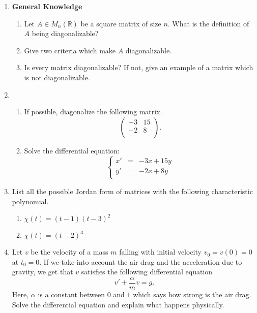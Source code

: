 \documentclass{article}
\begin{document}
\begin{enumerate}
\item \textbf{General Knowledge}
\begin{enumerate}
\item Let $A\in M_n(\mathbb R)$ be a square matrix of size $n$. What is the definition of $A$ being diagonalizable?

\vskip 2.5in

\item Give two criteria which make $A$ diagonalizable.

\vskip 2.5in

\item Is every matrix diagonalizable? If not, give an example of a matrix which is not diagonalizable.
\end{enumerate}


\newpage

\item 
\begin{enumerate}

\item If possible, diagonalize the following matrix.
\[\begin{pmatrix}
-3 & 15 \\
-2 & 8 \\
\end{pmatrix}.\]

\vskip 4in

\item Solve the differential equation:
\[ \left\{ 
\begin{array}{ccc} 
 x' & = & -3x + 15y \\
y'  & = & -2x + 8y \\
\end{array}
\right.
\]
\end{enumerate}

\newpage

\item List all the possible Jordan form of matrices with the following characteristic polynomial. 
\begin{enumerate}
\item $\chi(t) = (t-1)(t-3)^2 $
\item $\chi(t) = (t-2)^3 $
\end{enumerate}

\vskip 3in

\item Let $v$ be the velocity of a mass $m$ falling with initial velocity $v_0= v(0) = 0$ at $t_0=0$. If we take into account the air drag and the acceleration due to gravity, we get that $v$ satisfies the following differential equation \[v' +\frac{\alpha}{m}v =g.\]
Here, $\alpha$ is a constant between $0$ and $1$ which says how strong is the air drag. Solve the differential equation and explain what happens physically.


\end{enumerate}
\end{document}
